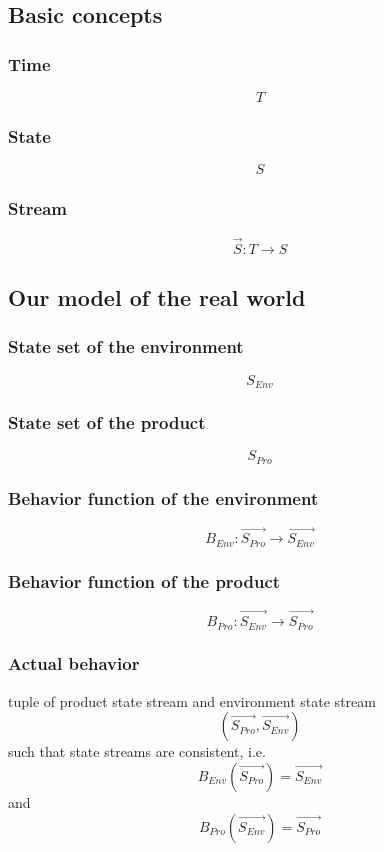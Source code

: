 \documentclass[conference]{IEEEtran}
\begin{document}
    \subsection{Basic concepts}

    \subsubsection{Time}
    \[
        T
    \]

    \subsubsection{State}
    \[
        S    
    \]

    \subsubsection{Stream}
    \[
        \overrightarrow{S}: T \rightarrow S
    \]

    \subsection{Our model of the real world}

    \subsubsection{State set of the environment}
    \[
        S_{Env}    
    \]

    \subsubsection{State set of the product}
    \[
        S_{Pro}    
    \]

    \subsubsection{Behavior function of the environment}
    \[
        B_{Env}: \overrightarrow{S_{Pro}} \rightarrow \overrightarrow{S_{Env}}
    \]
    
    \subsubsection{Behavior function of the product}
    \[
        B_{Pro}: \overrightarrow{S_{Env}} \rightarrow \overrightarrow{S_{Pro}}
    \]

    \subsubsection{Actual behavior}
    tuple of product state stream and environment state stream
    \[
        (\overrightarrow{S_{Pro}}, \overrightarrow{S_{Env}})
    \]
    such that state streams are consistent, i.e.
    \[
        B_{Env}(\overrightarrow{S_{Pro}}) = \overrightarrow{S_{Env}}
    \]
    and
    \[
        B_{Pro}(\overrightarrow{S_{Env}}) = \overrightarrow{S_{Pro}}
    \]
\end{document}
